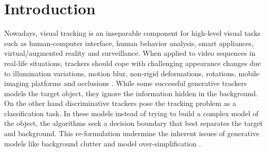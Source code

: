 \documentclass[conference,twoside]{IEEEtran}
\begin{document}
%
\IEEEpeerreviewmaketitle


\section{Introduction}
Nowadays, visual tracking is an inseparable component for high-level visual tasks such as human-computer interface, human behavior analysis, smart appliances, virtual/augmented reality and surveillance. When applied to video sequences in real-life situations, trackers should cope with challenging appearance changes due to illumination variations, motion blur, non-rigid deformations, rotations, mobile imaging platforms and occlusions \cite{wu2015object}. 
%
While some successful generative trackers \cite{adam2006robust,zhang2012real,oron2015locally,taalimi2015online} models the target object, they ignore the information hidden in the background. On the other hand discriminative trackers 
\cite{stalder2009beyond,babenko2009visual,grabner2010tracking,hare2011struck,dinh2011context,kalal2012tracking,henriques2012exploiting}
pose the tracking problem as a classification task. In these models instead of trying to build a complex model of the object, the algorithms seek a decision boundary that best separates the target and background. This re-formulation undermine the inherent issues of generative models like background clutter and model over-simplification \cite{tang2007co}.
\end{document}
